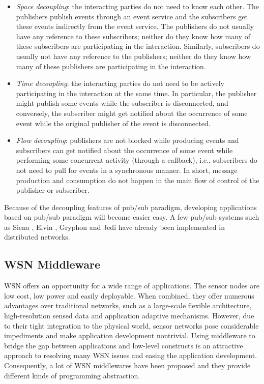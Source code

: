 \begin{itemize}
\item \emph{Space decoupling}: the interacting parties do not need to know each other. The publishers publish events through an event service and the subscribers get these events indirectly from the event service. The publishers do not usually have any reference to these subscribers; neither do they know how many of these subscribers are participating in the interaction. Similarly, subscribers do usually not have any reference to the publishers; neither do they know how many of these publishers are participating in the interaction.
\item \emph{Time decoupling}: the interacting parties do not need to be actively participating in the interaction at the same time. In particular, the publisher might publish some events while the subscriber is disconnected, and conversely, the subscriber might get notified about the occurrence of some event while the original publisher of the event is disconnected.
\item \emph{Flow decoupling}: publishers are not blocked while producing events and subscribers can get notified about the occurrence of some event while performing some concurrent activity (through a callback), i.e., subscribers do not need to pull for events in a synchronous manner. In short, message production and consumption do not happen in the main flow of control of the publisher or subscriber.
\end{itemize}

Because of the decoupling features of pub/sub paradigm, developing applications based on pub/sub paradigm will become easier easy. A few pub/sub systems such as Siena \cite{siena}, Elvin \cite{elvin}, Gryphon \cite{gryphon} and Jedi \cite{jedi} have already been implemented in distributed networks.

\subsection{WSN Middleware}
WSN offers an opportunity for a wide range of applications. The sensor nodes are low cost, low power and easily deployable. When combined, they offer numerous advantages over traditional networks, such as a large-scale flexible architecture, high-resolution sensed data and application adaptive mechanisms. However, due to their tight integration to the physical world, sensor networks pose considerable impediments and make application development nontrivial. Using middleware to bridge the gap between applications and low-level constructs is an attractive approach to resolving many WSN issues and easing the application development. Consequently, a lot of WSN middlewares have been proposed and they provide different kinds of programming abstraction.

